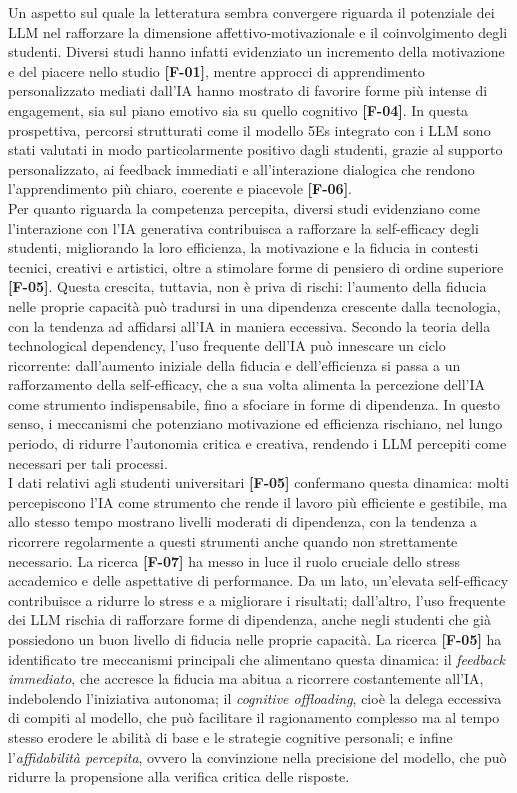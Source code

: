 \documentclass[a4paper,9pt]{article}
\begin{document}
Un aspetto sul quale la letteratura sembra convergere riguarda il potenziale dei LLM nel rafforzare la dimensione affettivo-motivazionale e il coinvolgimento degli studenti. Diversi studi hanno infatti evidenziato un incremento della motivazione e del piacere nello studio \textbf{[F-01]}, mentre approcci di apprendimento personalizzato mediati dall’IA hanno mostrato di favorire forme più intense di engagement, sia sul piano emotivo sia su quello cognitivo \textbf{[F-04]}. In questa prospettiva, percorsi strutturati come il modello 5Es integrato con i LLM sono stati valutati in modo particolarmente positivo dagli studenti, grazie al supporto personalizzato, ai feedback immediati e all’interazione dialogica che rendono l’apprendimento più chiaro, coerente e piacevole \textbf{[F-06]}.\\
Per quanto riguarda la competenza percepita, diversi studi evidenziano come l’interazione con l’IA generativa contribuisca a rafforzare la self-efficacy degli studenti, migliorando la loro efficienza, la motivazione e la fiducia in contesti tecnici, creativi e artistici, oltre a stimolare forme di pensiero di ordine superiore \textbf{[F-05]}. Questa crescita, tuttavia, non è priva di rischi: l’aumento della fiducia nelle proprie capacità può tradursi in una dipendenza crescente dalla tecnologia, con la tendenza ad affidarsi all’IA in maniera eccessiva. Secondo la teoria della technological dependency, l’uso frequente dell’IA può innescare un ciclo ricorrente: dall’aumento iniziale della fiducia e dell’efficienza si passa a un rafforzamento della self-efficacy, che a sua volta alimenta la percezione dell’IA come strumento indispensabile, fino a sfociare in forme di dipendenza. In questo senso, i meccanismi che potenziano motivazione ed efficienza rischiano, nel lungo periodo, di ridurre l’autonomia critica e creativa, rendendo i LLM percepiti come necessari per tali processi.\\
I dati relativi agli studenti universitari \textbf{[F-05]} confermano questa dinamica: molti percepiscono l’IA come strumento che rende il lavoro più efficiente e gestibile, ma allo stesso tempo mostrano livelli moderati di dipendenza, con la tendenza a ricorrere regolarmente a questi strumenti anche quando non strettamente necessario. La ricerca \textbf{[F-07]} ha messo in luce il ruolo cruciale dello stress accademico e delle aspettative di performance. Da un lato, un’elevata self-efficacy contribuisce a ridurre lo stress e a migliorare i risultati; dall’altro, l’uso frequente dei LLM rischia di rafforzare forme di dipendenza, anche negli studenti che già possiedono un buon livello di fiducia nelle proprie capacità. La ricerca \textbf{[F-05]} ha identificato tre meccanismi principali che alimentano questa dinamica: il \textit{feedback immediato}, che accresce la fiducia ma abitua a ricorrere costantemente all’IA, indebolendo l’iniziativa autonoma; il \textit{cognitive offloading}, cioè la delega eccessiva di compiti al modello, che può facilitare il ragionamento complesso ma al tempo stesso erodere le abilità di base e le strategie cognitive personali; e infine l’\textit{affidabilità percepita}, ovvero la convinzione nella precisione del modello, che può ridurre la propensione alla verifica critica delle risposte. \\
\end{document}
